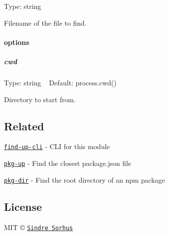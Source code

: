 Type\+: {\ttfamily string}

Filename of the file to find.

\paragraph*{options}

\subparagraph*{cwd}

Type\+: {\ttfamily string} ~\newline
Default\+: {\ttfamily process.\+cwd()}

Directory to start from.

\subsection*{Related}


\begin{DoxyItemize}
\item \href{https://github.com/sindresorhus/find-up-cli}{\tt find-\/up-\/cli} -\/ C\+LI for this module
\item \href{https://github.com/sindresorhus/pkg-up}{\tt pkg-\/up} -\/ Find the closest package.\+json file
\item \href{https://github.com/sindresorhus/pkg-dir}{\tt pkg-\/dir} -\/ Find the root directory of an npm package
\end{DoxyItemize}

\subsection*{License}

M\+IT © \href{http://sindresorhus.com}{\tt Sindre Sorhus} 
